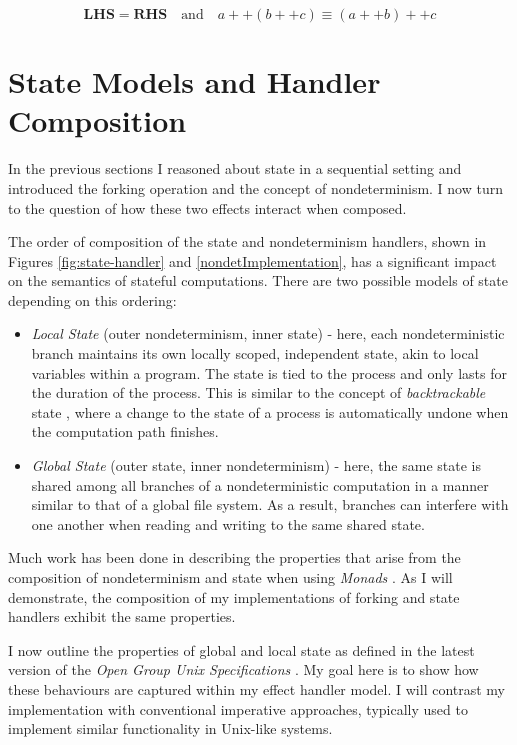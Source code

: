 \documentclass[logo,bsc,singlespacing,parskip]{infthesis}
\begin{document}
\[
\textbf{LHS} = \textbf{RHS} \quad \text{and} \quad a ++ (b ++ c) \equiv (a ++ b) ++ c
\]




\section{State Models and Handler Composition}
In the previous sections I reasoned about state in a  sequential setting and introduced the forking operation and the concept of nondeterminism. I now turn to the question of how these two effects interact when composed. 

The order of composition of the state  and nondeterminism handlers, shown in Figures \ref{fig:state-handler} and \ref{nondetImplementation}, has a significant impact on the semantics of stateful computations. There are two possible models of state  depending on this ordering: 
\begin{itemize}
    \item \textit{Local State} (outer nondeterminism, inner state) - here, each nondeterministic branch maintains its own locally scoped, independent state, akin to local variables within a program.  The state is tied to the process and only lasts for the duration of the process. This is similar to the concept of \textit{backtrackable} state \cite{pauwels2019handling}, where a change to the state of a process is automatically undone when the computation path finishes. 
    \item \textit{Global State} (outer state, inner nondeterminism) - here, the same state is shared among all branches of a nondeterministic computation in a manner similar to that  of a global file system. As a result, branches can interfere with one another when reading and writing to the same shared state.
\end{itemize}

Much work has been done in describing the properties that arise from the composition of nondeterminism and state when using \textit{Monads} \cite{tang2025high}. As I will demonstrate, the composition of my implementations of forking and state handlers exhibit the same properties. 

I now outline the properties of global and local state as defined in the latest version of the \textit{Open Group Unix Specifications} \cite{posix}. My goal here is to show how these behaviours are captured within my effect handler model. I will contrast my implementation with conventional imperative approaches, typically used to implement similar functionality in Unix-like systems. 
\end{document}
